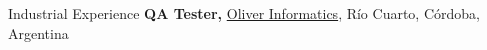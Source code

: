 \begin{rubric}{Industrial Experience}
	\textbf{QA Tester, } \href{https://www.oliverinformatica.com/}{Oliver Informatics}, Río Cuarto, Córdoba, Argentina
\end{rubric}